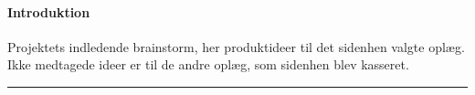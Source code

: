 \paragraph{Introduktion} Projektets indledende brainstorm, her produktideer til det sidenhen valgte oplæg. Ikke medtagede ideer er til de andre oplæg, som sidenhen blev kasseret. \\
\hrule
{}
